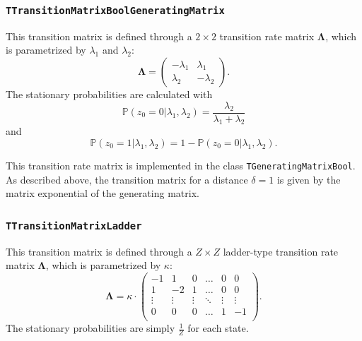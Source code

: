 \documentclass[a4paper,11pt]{article}
\def\bLambda{\boldsymbol{\Lambda}}
\def\p{\mathbb{P}}
\newcommand{\class}[1]{\texttt{#1}}
\begin{document}
\subsubsection{\class{TTransitionMatrixBoolGeneratingMatrix}}\label{section:TTransitionMatrixBoolGeneratingMatrix}

This transition matrix is defined through a $2 \times 2$ transition rate matrix $\bLambda$, which is parametrized by $\lambda_1$ and $\lambda_2$:
\begin{equation}\label{eq:generatorMatrixBool}
 \bLambda =   \begin{pmatrix}
  -\lambda_1 & \lambda_1 \\
  \lambda_2 & -\lambda_2
\end{pmatrix} .
\end{equation}
The stationary probabilities are calculated with
\begin{equation*}
\p(z_0 = 0 | \lambda_1, \lambda_2) = \frac{\lambda_2}{\lambda_1 + \lambda_2}
\end{equation*}
and
\begin{equation*}
\p(z_0 = 1 | \lambda_1, \lambda_2) = 1 - \p(z_0 = 0| \lambda_1, \lambda_2).
\end{equation*}

This transition rate matrix is implemented in the class \class{TGeneratingMatrixBool}. As described above, the transition matrix for a distance $\delta = 1$ is given by the matrix exponential of the generating matrix.

\subsubsection{\class{TTransitionMatrixLadder}}\label{section:TTransitionMatrixLadder}
This transition matrix is defined through a $Z \times Z$ ladder-type transition rate matrix $\bLambda$, which is parametrized by $\kappa$:
    \begin{equation*}
    \bLambda = \kappa \cdot \left(\begin{array}{cccccc}
    -1 & 1 & 0 & \dots & 0 & 0\\
    1 & -2 & 1 & \dots & 0 & 0\\
    \vdots & \vdots & \vdots & \ddots & \vdots & \vdots\\
    0 & 0 & 0 & \dots & 1& -1\\
    \end{array}\right).
    \end{equation*}
The stationary probabilities are simply $\frac{1}{Z}$ for each state.
\end{document}
